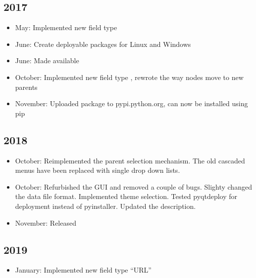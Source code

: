 \documentclass[letterpaper,10pt,english]{sphinxmanual}
\begin{document}
\subsection{2017}
\label{\detokenize{releases:id3}}\begin{itemize}
\item {} 
\sphinxAtStartPar
May: Implemented new field type 

\item {} 
\sphinxAtStartPar
June: Create deployable packages for Linux and Windows

\item {} 
\sphinxAtStartPar
June: Made  available

\item {} 
\sphinxAtStartPar
October: Implemented new field type , re\sphinxhyphen{}wrote the way nodes move to new parents

\item {} 
\sphinxAtStartPar
November: Uploaded package to pypi.python.org,  can now be installed using pip

\end{itemize}


\subsection{2018}
\label{\detokenize{releases:id4}}\begin{itemize}
\item {} 
\sphinxAtStartPar
October: Re\sphinxhyphen{}implemented the parent selection mechanism. The old cascaded menus have been replaced with single drop down lists.

\item {} 
\sphinxAtStartPar
October: Re\sphinxhyphen{}furbished the GUI and removed a couple of bugs. Slighty changed the data file format. Implemented theme selection. Tested pyqtdeploy for deployment instead of pyinstaller. Updated the description.

\item {} 
\sphinxAtStartPar
November: Released 

\end{itemize}


\subsection{2019}
\label{\detokenize{releases:id5}}\begin{itemize}
\item {} 
\sphinxAtStartPar
January: Implemented new field type “URL”

\end{itemize}
\end{document}
